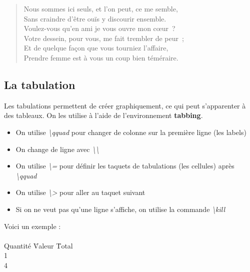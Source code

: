 \documentclass[a4paper, 10pt]{book}
\begin{document}
\small

\begin{center} 
\end{center} 

\begin{quote} 
   Nous sommes ici seuls, et l'on peut, ce me semble, \\
   Sans craindre d'être ouïs y discourir ensemble. \\
   Voulez-vous qu'en ami je vous ouvre mon c\oe{}ur~? \\
   Votre dessein, pour vous, me fait trembler de peur~; \\
   Et de quelque façon que vous tourniez l'affaire, \\
   Prendre femme est à vous un coup bien téméraire.
\end{quote} 

\normalsize

\subsection{La tabulation}
Les tabulations permettent de créer graphiquement, ce qui peut s'apparenter à des tableaux. On les utilise à l'aide de l'environnement \textbf{tabbing}.\\

\begin{itemize}
\item On utilise \textit{\textbackslash qquad} pour changer de colonne sur la première ligne (les \textsf{labels})
\item On change de ligne avec \textit{\textbackslash \textbackslash}
\item On utilise \textit{\textbackslash =} pour définir les taquets de tabulations (les cellules) après \textit{\textbackslash qquad}
\item On utilise \textit{\textbackslash >} pour aller au taquet suivant
\item Si on ne veut pas qu'une ligne s'affiche, on utilise la commande \textit{\textbackslash kill}\\
\end{itemize}

\begin{tabbing}
Voici un exemple :\\ \\
Quantité \qquad \= Valeur \qquad \= Total \\
1  \\
4   \\
\end{tabbing}
\end{document}
